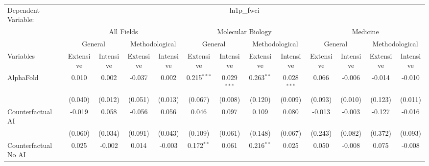 \begingroup
\centering
\begin{tabular}{lcccccccccccc}
   \tabularnewline \midrule \midrule
   Dependent Variable: & \multicolumn{12}{c}{ln1p\_fwci}\\
 & \multicolumn{4}{c}{All Fields} & \multicolumn{4}{c}{Molecular Biology} & \multicolumn{4}{c}{Medicine} \\
\cmidrule(lr){2-5} \cmidrule(lr){6-9} \cmidrule(lr){10-13}
 & \multicolumn{2}{c}{General} & \multicolumn{2}{c}{Methodological} & \multicolumn{2}{c}{General} & \multicolumn{2}{c}{Methodological} & \multicolumn{2}{c}{General} & \multicolumn{2}{c}{Methodological} \\
\cmidrule(lr){2-3} \cmidrule(lr){4-5} \cmidrule(lr){6-7} \cmidrule(lr){8-9} \cmidrule(lr){10-11} \cmidrule(lr){12-13}
Variables & \multicolumn{1}{c}{Extensive} & \multicolumn{1}{c}{Intensive} & \multicolumn{1}{c}{Extensive} & \multicolumn{1}{c}{Intensive} & \multicolumn{1}{c}{Extensive} & \multicolumn{1}{c}{Intensive} & \multicolumn{1}{c}{Extensive} & \multicolumn{1}{c}{Intensive} & \multicolumn{1}{c}{Extensive} & \multicolumn{1}{c}{Intensive} & \multicolumn{1}{c}{Extensive} & \multicolumn{1}{c}{Intensive} \\
\cmidrule(lr){1-1}\cmidrule(lr){2-2} \cmidrule(lr){3-3} \cmidrule(lr){4-4} \cmidrule(lr){5-5} \cmidrule(lr){6-6} \cmidrule(lr){7-7} \cmidrule(lr){8-8} \cmidrule(lr){9-9} \cmidrule(lr){10-10} \cmidrule(lr){11-11} \cmidrule(lr){12-12} \cmidrule(lr){13-13}
   AlphaFold                                & 0.010         & 0.002    & -0.037        & 0.002    & 0.215$^{***}$ & 0.029$^{***}$  & 0.263$^{**}$  & 0.028$^{***}$ & 0.066   & -0.006  & -0.014  & -0.010\\   
                                            & (0.040)       & (0.012)  & (0.051)       & (0.013)  & (0.067)       & (0.008)        & (0.120)       & (0.009)       & (0.093) & (0.010) & (0.123) & (0.011)\\   
   Counterfactual AI                        & -0.019        & 0.058    & -0.056        & 0.056    & 0.046         & 0.097          & 0.109         & 0.080         & -0.013  & -0.003  & -0.127  & -0.016\\   
                                            & (0.060)       & (0.034)  & (0.091)       & (0.043)  & (0.109)       & (0.061)        & (0.148)       & (0.067)       & (0.243) & (0.082) & (0.372) & (0.093)\\   
   Counterfactual No AI                     & 0.025         & -0.002   & 0.014         & -0.003   & 0.172$^{**}$  & 0.061          & 0.216$^{**}$  & 0.025         & 0.050   & -0.008  & 0.075   & -0.008\\   

\end{tabular}
